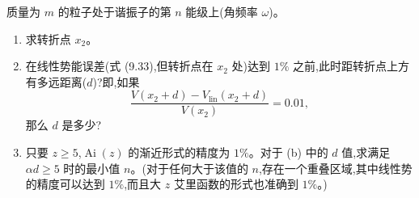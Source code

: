 \begin{question}
质量为 $m$ 的粒子处于谐振子的第 $n$ 能级上(角频率 $\omega$)。
\begin{enumerate}
\item 求转折点 $x_2$。
\item 在线性势能误差(式 (9.33),但转折点在 $x_2$ 处)达到 $1\%$ 之前,此时距转折点上方有多远距离($d$)?即,如果
\[
\frac{V(x_2+d)-V_{\mathrm{lin}}(x_2+d)}{V(x_2)}=0.01,
\]
那么 $d$ 是多少?
\item 只要 $z\ge5$,$\operatorname{Ai}(z)$ 的渐近形式的精度为 $1\%$。对于 (b) 中的 $d$ 值,求满足 $\alpha d\ge5$ 时的最小值 $n$。(对于任何大于该值的 $n$,存在一个重叠区域,其中线性势的精度可以达到 $1\%$,而且大 $z$ 艾里函数的形式也准确到 $1\%$。)
\end{enumerate}

\par\smallskip
{}

\end{question}

